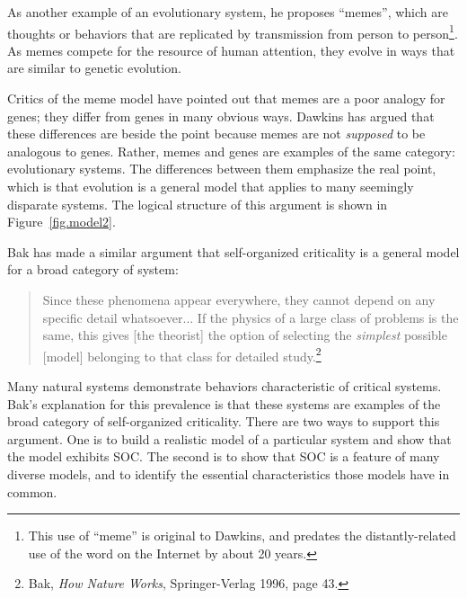 \documentclass[12pt]{book}
\theoremstyle{exercise}
\begin{document}

As another example of an evolutionary system, he proposes ``memes'',
which are thoughts or behaviors that are replicated by transmission
from person to person\footnote{This use of ``meme'' is original to
  Dawkins, and predates the distantly-related use of the word on the
  Internet by about 20 years.}.  As memes compete for the resource of
human attention, they evolve in ways that are similar to genetic
evolution.


Critics of the meme model have pointed out that
memes are a poor analogy for genes; they differ from genes in many
obvious ways.  Dawkins has argued that these differences are
beside the point because memes are not {\em supposed} to be analogous
to genes.  Rather, memes and genes are examples of the same
category: evolutionary systems.  The differences between them
emphasize the real point, which is that evolution is a general model
that applies to many seemingly disparate systems.  The logical
structure of this argument is shown in Figure~\ref{fig.model2}.


Bak has made a similar argument that self-organized criticality is a
general model for a broad category of system:

\begin{quote}
Since these phenomena appear everywhere, they cannot depend on any
specific detail whatsoever...  If the physics of a large class of
problems is the same, this gives [the theorist] the option of selecting
the {\em simplest} possible [model] belonging to that class for detailed
study.\footnote{Bak, {\em How Nature Works}, Springer-Verlag 1996, page 43.}
\end{quote}


Many natural systems demonstrate behaviors characteristic of critical
systems.  Bak's explanation for this prevalence is that these systems
are examples of the broad category of self-organized criticality.
There are two ways to support this argument.  One is to build
a realistic model of a particular system and show that the model
exhibits SOC.  The second is to show that SOC is a feature of many
diverse models, and to identify the essential characteristics
those models have in common.
\end{document}

